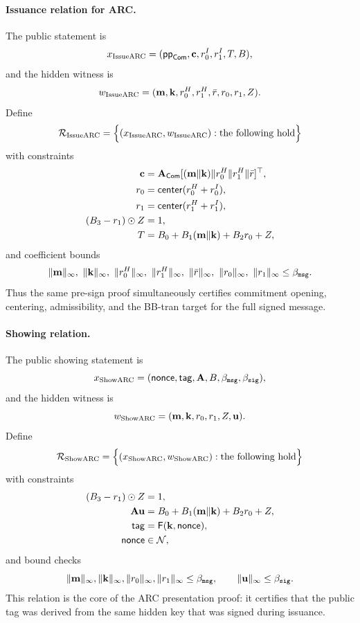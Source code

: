 \paragraph{Issuance relation for ARC.}
The public statement is
\[
  x_{\mathrm{IssueARC}}=(\mathsf{pp}_{\mathsf{Com}},\mathbf{c},r_0^I,r_1^I,T,B),
\]
and the hidden witness is
\[
  w_{\mathrm{IssueARC}}=(\mathbf{m},\mathbf{k},r_0^H,r_1^H,\bar r,r_0,r_1,Z).
\]
Define
\[
  \mathcal R_{\mathrm{IssueARC}}
  =
  \Bigl\{(x_{\mathrm{IssueARC}},w_{\mathrm{IssueARC}}): \text{the following hold}\Bigr\}
\]
with constraints
\begin{align}
  \mathbf{c} &= \mathbf{A}_{\mathsf{Com}}[(\mathbf{m}\Vert\mathbf{k})\Vert r_0^H\Vert r_1^H\Vert \bar r]^\top, \label{eq:issuearc-rel-commit}\\
  r_0 &= \mathsf{center}(r_0^H+r_0^I), \label{eq:issuearc-rel-center0}\\
  r_1 &= \mathsf{center}(r_1^H+r_1^I), \label{eq:issuearc-rel-center1}\\
  (B_3-r_1)\odot Z &= 1, \label{eq:issuearc-rel-inv}\\
  T &= B_0+B_1(\mathbf{m}\Vert\mathbf{k})+B_2r_0+Z, \label{eq:issuearc-rel-target}
\end{align}
and coefficient bounds
\[
  \|\vecm\|_\infty,\ \|\veck\|_\infty,\ \|r_0^H\|_\infty,\ \|r_1^H\|_\infty,\ \|\bar r\|_\infty,
  \ \|r_0\|_\infty,\ \|r_1\|_\infty
  \le \BoundMsg.
\]
Thus the same pre-sign proof simultaneously certifies commitment opening, centering, admissibility, and the
BB-tran target for the full signed message.

\paragraph{Showing relation.}
The public showing statement is
\[
  x_{\mathrm{ShowARC}}=(\mathsf{nonce},\mathsf{tag},\mathbf{A},B,\beta_{\mathtt{msg}},\beta_{\mathtt{sig}}),
\]
and the hidden witness is
\[
  w_{\mathrm{ShowARC}}=(\mathbf{m},\mathbf{k},r_0,r_1,Z,\mathbf{u}).
\]
Define
\[
  \mathcal R_{\mathrm{ShowARC}}
  =
  \Bigl\{(x_{\mathrm{ShowARC}},w_{\mathrm{ShowARC}}): \text{the following hold}\Bigr\}
\]
with constraints
\begin{align}
  (B_3-r_1)\odot Z &= 1, \label{eq:showarc-rel-inv}\\
  \mathbf{A}\mathbf{u} &= B_0+B_1(\mathbf{m}\Vert\mathbf{k})+B_2r_0+Z, \label{eq:showarc-rel-sig}\\
  \mathsf{tag} &= \mathsf{F}(\mathbf{k},\mathsf{nonce}), \label{eq:showarc-rel-prf}\\
  \mathsf{nonce} &\in \mathcal{N}, \label{eq:showarc-rel-nonce}
\end{align}
and bound checks
\[
  \|\mathbf{m}\|_\infty,\|\mathbf{k}\|_\infty,\|r_0\|_\infty,\|r_1\|_\infty\le \beta_{\mathtt{msg}},
  \qquad
  \|\mathbf{u}\|_\infty\le \beta_{\mathtt{sig}}.
\]
This relation is the core of the ARC presentation proof: it certifies that the public tag was derived from the
same hidden key that was signed during issuance.

